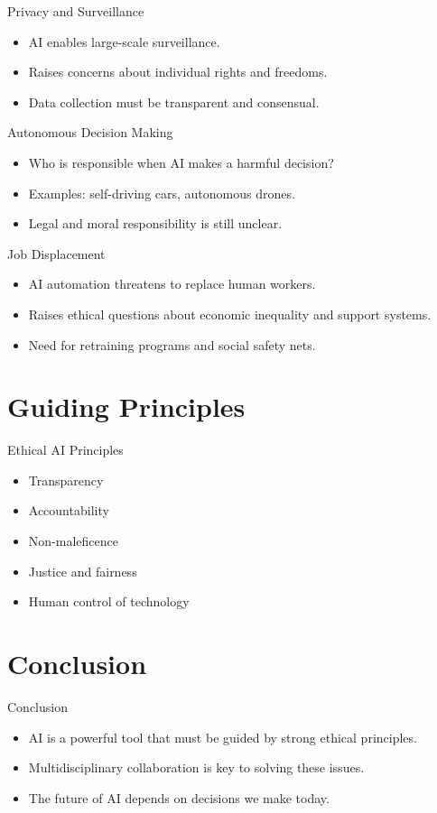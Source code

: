 \documentclass{beamer}
\begin{document}
\begin{frame}{Privacy and Surveillance}
  \begin{itemize}
    \item AI enables large-scale surveillance.
    \item Raises concerns about individual rights and freedoms.
    \item Data collection must be transparent and consensual.
  \end{itemize}
\end{frame}

\begin{frame}{Autonomous Decision Making}
  \begin{itemize}
    \item Who is responsible when AI makes a harmful decision?
    \item Examples: self-driving cars, autonomous drones.
    \item Legal and moral responsibility is still unclear.
  \end{itemize}
\end{frame}

\begin{frame}{Job Displacement}
  \begin{itemize}
    \item AI automation threatens to replace human workers.
    \item Raises ethical questions about economic inequality and support systems.
    \item Need for retraining programs and social safety nets.
  \end{itemize}
\end{frame}

\section{Guiding Principles}
\begin{frame}{Ethical AI Principles}
  \begin{itemize}
    \item Transparency
    \item Accountability
    \item Non-maleficence
    \item Justice and fairness
    \item Human control of technology
  \end{itemize}
\end{frame}

\section{Conclusion}
\begin{frame}{Conclusion}
  \begin{itemize}
    \item AI is a powerful tool that must be guided by strong ethical principles.
    \item Multidisciplinary collaboration is key to solving these issues.
    \item The future of AI depends on decisions we make today.
  \end{itemize}
\end{frame}
\end{document}
